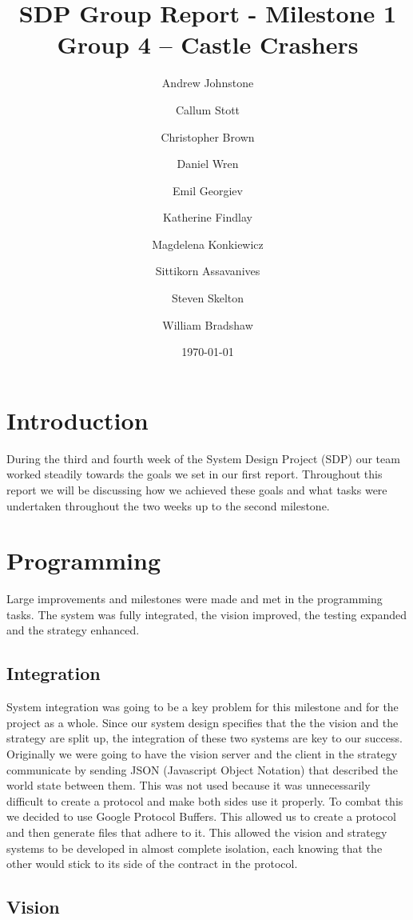 \documentclass[12pt, a4paper, titlepage]{article}
\title{\small{SDP Group Report - Milestone 1} \\ \huge Group 4 -- Castle Crashers}
\author{Andrew Johnstone \and Callum Stott \and Christopher Brown \and Daniel Wren \and Emil Georgiev \and Katherine Findlay \and Magdelena Konkiewicz \and Sittikorn Assavanives \and Steven Skelton \and William Bradshaw}
\date{\today}
\begin{document}
\maketitle

\section{Introduction}

During the third and fourth week of the System Design Project (SDP) our team
worked steadily towards the goals we set in our first report. Throughout this
report we will be discussing how we achieved these goals and what tasks were
undertaken throughout the two weeks up to the second milestone.

\section{Programming}

Large improvements and milestones were made and met in the programming tasks.
The system was fully integrated, the vision improved, the testing expanded and
the strategy enhanced.

\subsection{Integration}

System integration was going to be a key problem for this milestone and for
the project as a whole. Since our system design specifies that the the vision
and the strategy are split up, the integration of these two systems are key
to our success. Originally we were going to have the vision server and the
client in the strategy communicate by sending JSON (Javascript Object Notation)
that described the world state between them. This was not used because it
was unnecessarily difficult to create a protocol and make both sides use it
properly. To combat this we decided to use Google Protocol Buffers. This allowed
us to create a protocol and then generate files that adhere to it. This allowed
the vision and strategy systems to be developed in almost complete isolation,
each knowing that the other would stick to its side of the contract in the
protocol.

\subsection{Vision}
\end{document}

